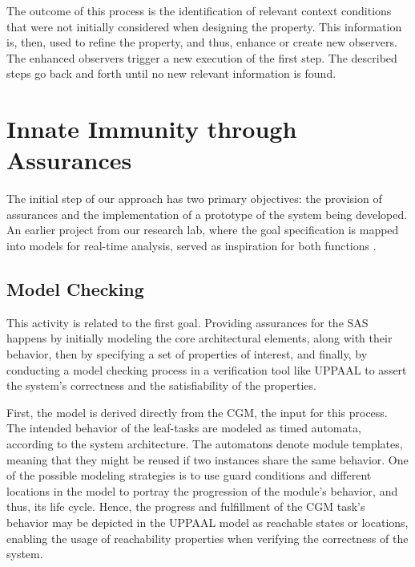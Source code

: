 The outcome of this process is the identification of relevant context conditions that were not initially considered when designing the property. This information is, then, used to refine the property, and thus, enhance or create new observers. The enhanced observers trigger a new execution of the first step. The described steps go back and forth until no new relevant information is found. 


\section{Innate Immunity through Assurances}

The initial step of our approach has two primary objectives: the provision of assurances and the implementation of a prototype of the system being developed. An earlier project from our research lab, where the goal specification is mapped into models for real-time analysis, served as inspiration for both functions \cite{seams2018}.

\subsection{Model Checking}

This activity is related to the first goal. Providing assurances for the SAS happens by initially modeling the core architectural elements, along with their behavior, then by specifying a set of properties of interest, and finally, by conducting a model checking process in a verification tool like UPPAAL \cite{UPPAAL} to assert the system's correctness and the satisfiability of the properties.

First, the model is derived directly from the CGM, the input for this process. The intended behavior of the leaf-tasks are modeled as timed automata, according to the system architecture. The automatons denote module templates, meaning that they might be reused if two instances share the same behavior. One of the possible modeling strategies is to use guard conditions and different locations in the model to portray the progression of the module's behavior, and thus, its life cycle. Hence, the progress and fulfillment of the CGM task's behavior may be depicted in the UPPAAL model as reachable states or locations, enabling the usage of reachability properties when verifying the correctness of the system.

